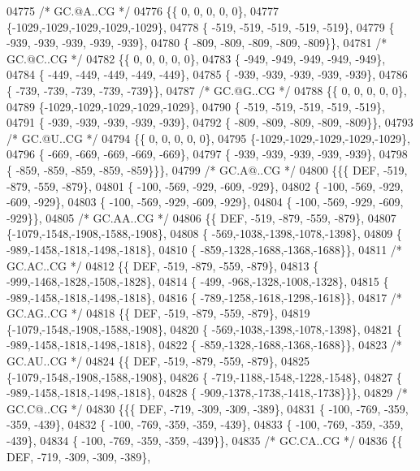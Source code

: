 \begin{DoxyCode}
04775 \textcolor{comment}{/* GC.@A..CG */}
04776 \{\{    0,    0,    0,    0,    0\},
04777 \{-1029,-1029,-1029,-1029,-1029\},
04778 \{ -519, -519, -519, -519, -519\},
04779 \{ -939, -939, -939, -939, -939\},
04780 \{ -809, -809, -809, -809, -809\}\},
04781 \textcolor{comment}{/* GC.@C..CG */}
04782 \{\{    0,    0,    0,    0,    0\},
04783 \{ -949, -949, -949, -949, -949\},
04784 \{ -449, -449, -449, -449, -449\},
04785 \{ -939, -939, -939, -939, -939\},
04786 \{ -739, -739, -739, -739, -739\}\},
04787 \textcolor{comment}{/* GC.@G..CG */}
04788 \{\{    0,    0,    0,    0,    0\},
04789 \{-1029,-1029,-1029,-1029,-1029\},
04790 \{ -519, -519, -519, -519, -519\},
04791 \{ -939, -939, -939, -939, -939\},
04792 \{ -809, -809, -809, -809, -809\}\},
04793 \textcolor{comment}{/* GC.@U..CG */}
04794 \{\{    0,    0,    0,    0,    0\},
04795 \{-1029,-1029,-1029,-1029,-1029\},
04796 \{ -669, -669, -669, -669, -669\},
04797 \{ -939, -939, -939, -939, -939\},
04798 \{ -859, -859, -859, -859, -859\}\}\},
04799 \textcolor{comment}{/* GC.A@..CG */}
04800 \{\{\{  DEF, -519, -879, -559, -879\},
04801 \{ -100, -569, -929, -609, -929\},
04802 \{ -100, -569, -929, -609, -929\},
04803 \{ -100, -569, -929, -609, -929\},
04804 \{ -100, -569, -929, -609, -929\}\},
04805 \textcolor{comment}{/* GC.AA..CG */}
04806 \{\{  DEF, -519, -879, -559, -879\},
04807 \{-1079,-1548,-1908,-1588,-1908\},
04808 \{ -569,-1038,-1398,-1078,-1398\},
04809 \{ -989,-1458,-1818,-1498,-1818\},
04810 \{ -859,-1328,-1688,-1368,-1688\}\},
04811 \textcolor{comment}{/* GC.AC..CG */}
04812 \{\{  DEF, -519, -879, -559, -879\},
04813 \{ -999,-1468,-1828,-1508,-1828\},
04814 \{ -499, -968,-1328,-1008,-1328\},
04815 \{ -989,-1458,-1818,-1498,-1818\},
04816 \{ -789,-1258,-1618,-1298,-1618\}\},
04817 \textcolor{comment}{/* GC.AG..CG */}
04818 \{\{  DEF, -519, -879, -559, -879\},
04819 \{-1079,-1548,-1908,-1588,-1908\},
04820 \{ -569,-1038,-1398,-1078,-1398\},
04821 \{ -989,-1458,-1818,-1498,-1818\},
04822 \{ -859,-1328,-1688,-1368,-1688\}\},
04823 \textcolor{comment}{/* GC.AU..CG */}
04824 \{\{  DEF, -519, -879, -559, -879\},
04825 \{-1079,-1548,-1908,-1588,-1908\},
04826 \{ -719,-1188,-1548,-1228,-1548\},
04827 \{ -989,-1458,-1818,-1498,-1818\},
04828 \{ -909,-1378,-1738,-1418,-1738\}\}\},
04829 \textcolor{comment}{/* GC.C@..CG */}
04830 \{\{\{  DEF, -719, -309, -309, -389\},
04831 \{ -100, -769, -359, -359, -439\},
04832 \{ -100, -769, -359, -359, -439\},
04833 \{ -100, -769, -359, -359, -439\},
04834 \{ -100, -769, -359, -359, -439\}\},
04835 \textcolor{comment}{/* GC.CA..CG */}
04836 \{\{  DEF, -719, -309, -309, -389\},

\end{DoxyCode}
